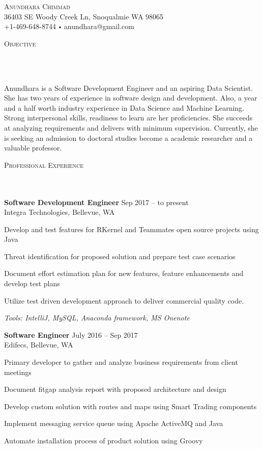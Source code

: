 \documentclass{article}
\newcommand{\contact}[3]{
\vspace*{5pt}
\begin{center}
{\LARGE \scshape {#1}}\\
\vspace{3pt}
#2 
\vspace{2pt}
#3
\end{center}
\vspace*{-8pt}
}
\newcommand{\header}[1]{{
\hspace*{-15pt}\vspace*{6pt} \textsc{#1}} \vspace*{-6pt} 
\lineunder
}
\newcommand{\lineunder}{
\vspace*{-8pt} \\ \hspace*{-18pt} 
\hrulefill \\
}
\newcommand{\content}{
\vspace*{2pt}%
}
\newcommand{\employer}[4]{{
\vspace*{2pt}%
\textbf{#1} #2 \hfill #3\\ #4 \vspace*{2pt}}
}
\renewcommand{\labelitemi}{
$\vcenter{\hbox{\tiny$\bullet$}}$\hspace*{3pt}
}
\renewcommand{\labelitemii}{
$\vcenter{\hbox{\tiny$\bullet$}}$\hspace*{-3pt}
}
\newenvironment{bullet-list-minor}{
\begin{list}{\labelitemii}{\setlength\leftmargin{15pt} 
\topsep 0pt \itemsep -2pt}}{\vspace*{4pt}\end{list}
}
\begin{document}
\small
\smallskip
\vspace*{-44pt}

\contact{Anundhara Chimmad}
{36403 SE Woody Creek Ln, Snoqualmie WA 98065\\}
{+1-469-648-8744 \labelitemi anundhara@gmail.com}
\vspace{15pt}
\header{Objective}
 \content{ Anundhara is a Software Development Engineer and an aspiring Data Scientist. She has two years of experience in software design and development. Also, a year and a half worth industry experience in Data Science and Machine Learning. Strong interpersonal skills, readiness to learn are her proficiencies. She succeeds at analyzing requirements and delivers with minimum supervision. Currently, she is seeking an admission to doctoral studies become a academic researcher and a valuable professor.
\vspace*{4pt}%

\header{Professional Experience}
    \employer{Software Development Engineer}{}{Sep 2017 -- to present}{Integra Technologies, Bellevue, WA}
	\begin{bullet-list-minor}
	\item Develop and test features for RKernel and Teammates open source projects using Java
	\item Threat identification for proposed solution and prepare test case scenarios 
	\item Document effort estimation plan for new features, feature enhancements and develop test plans  
	\item Utilize test driven development approach to deliver commercial quality code. 
	
	\textit{Tools: IntelliJ, MySQL, Anaconda framework, MS Onenote}
    \end{bullet-list-minor}

    \employer{Software Engineer}{}{July 2016 -- Sep 2017}{Edifecs, Bellevue, WA}
	\begin{bullet-list-minor}
	\item Primary developer to gather and analyze business requirements from client meetings	
	\item Document fitgap analysis report with proposed architecture and design
	\item Develop custom solution with routes and maps using Smart Trading components
	\item Implement messaging service queue using Apache ActiveMQ and Java 
	\item Automate installation process of product solution using Groovy
	

\end{bullet-list-minor}}
\end{document}
